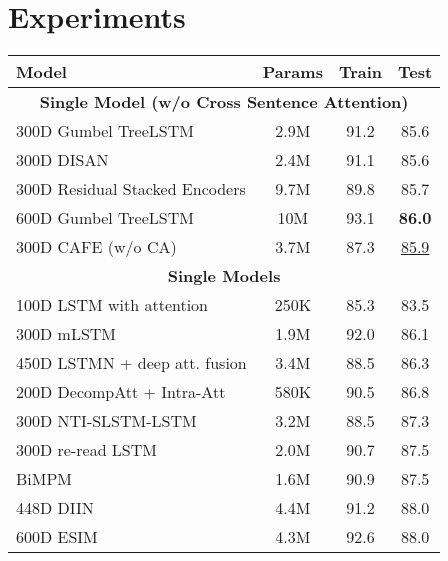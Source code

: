 \documentclass[11pt,a4paper]{article}
\begin{document}
\section{Experiments}

\begin{table*}[ht]
  \centering

    \begin{tabular}{|l|ccc|}
    \hline
    Model & Params & Train& Test\\
    \hline
    \multicolumn{4}{|c|}{\textbf{Single Model (w/o Cross Sentence Attention)}} \\
    \hline
300D Gumbel TreeLSTM \cite{choi2017unsupervised} & 2.9M&91.2 &85.6 \\
    300D DISAN \cite{DBLP:journals/corr/abs-1709-04696}&2.4M &91.1 & 85.6\\
    300D Residual Stacked Encoders \cite{DBLP:conf/repeval/NieB17} & 9.7M & 89.8& 85.7\\
    600D Gumbel TreeLSTM \cite{choi2017unsupervised}& 10M & 93.1 & \textbf{86.0}\\
    300D \textsc{CAFE} (w/o CA)  & 3.7M& 87.3 & \underline{85.9}\\
    \hline
    \multicolumn{4}{|c|}{\textbf{Single Models}} \\
    \hline
    100D LSTM with attention \cite{rocktaschel2015reasoning} & 250K  & 85.3  & 83.5 \\
300D mLSTM  \cite{DBLP:conf/naacl/WangJ16}& 1.9M  & 92.0    & 86.1 \\
    450D LSTMN + deep att. fusion \cite{DBLP:conf/emnlp/0001DL16} & 3.4M  & 88.5  & 86.3 \\
200D DecompAtt + Intra-Att \cite{DBLP:conf/emnlp/ParikhT0U16}  & 580K  & 90.5  & 86.8 \\
    300D NTI-SLSTM-LSTM \cite{DBLP:conf/eacl/YuM17} & 3.2M  & 88.5  & 87.3 \\
    300D re-read LSTM \cite{DBLP:conf/coling/ShaCSL16} & 2.0M  & 90.7  & 87.5 \\
    BiMPM \cite{DBLP:conf/ijcai/WangHF17} & 1.6M & 90.9 & 87.5 \\
     448D DIIN \cite{DBLP:journals/corr/abs-1709-04348} & 4.4M  & 91.2  & 88.0 \\
    600D ESIM \cite{DBLP:conf/acl/ChenZLWJI17} & 4.3M  & 92.6  & 88.0 \\


\end{tabular}
\end{table*}
\end{document}
